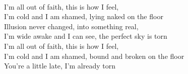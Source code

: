 \\
I'm all out of faith, this is how I feel, \\
I'm cold and I am shamed, lying naked on the floor \\
Illusion never changed, into something real, \\
I'm wide awake and I can see, the perfect sky is torn \\
I'm all out of faith, this is how I feel, \\
I'm cold and I am shamed, bound and broken on the floor \\
You're a little late, I'm already torn
